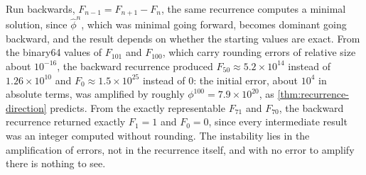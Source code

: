 \begin{table}
\end{table}

Run backwards, $F_{n-1}=F_{n+1}-F_n$, the same recurrence computes a minimal solution, since $\hat\phi^n$, which was minimal going forward, becomes dominant going backward, and the result depends on whether the starting values are exact. From the binary64 values of $F_{101}$ and $F_{100}$, which carry rounding errors of relative size about $10^{-16}$, the backward recurrence produced $F_{50}\approx5.2\times10^{14}$ instead of $1.26\times10^{10}$ and $F_0\approx1.5\times10^{25}$ instead of $0$: the initial error, about $10^4$ in absolute terms, was amplified by roughly $\phi^{100}=7.9\times10^{20}$, as \cref{thm:recurrence-direction} predicts. From the exactly representable $F_{71}$ and $F_{70}$, the backward recurrence returned exactly $F_1=1$ and $F_0=0$, since every intermediate result was an integer computed without rounding. The instability lies in the amplification of errors, not in the recurrence itself, and with no error to amplify there is nothing to see.

